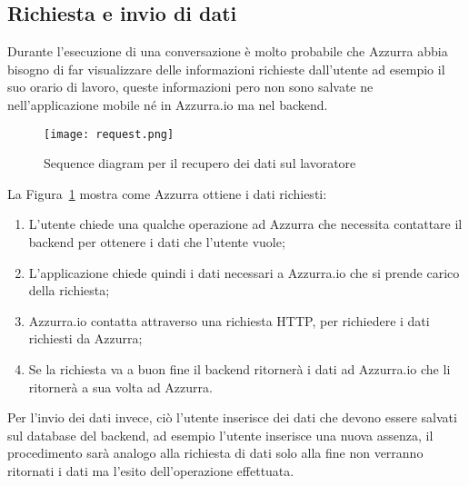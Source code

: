 \subsection{Richiesta e invio di dati}
Durante l'esecuzione di una conversazione è molto probabile che Azzurra abbia bisogno di far visualizzare delle informazioni richieste dall'utente ad esempio il suo orario di lavoro, queste informazioni pero non sono salvate ne nell'applicazione mobile né in Azzurra.io ma nel backend.
\begin{figure}[h]
	\begin{center}
		\texttt{[image: request.png]}
		\caption{Sequence diagram per il recupero dei dati sul lavoratore}\label{fig:request}
	\end{center}
\end{figure}
La Figura~\ref{fig:request} mostra come Azzurra ottiene i dati richiesti:
\begin{enumerate}
	\item L'utente chiede una qualche operazione ad Azzurra che necessita contattare il backend per ottenere i dati che l'utente vuole;
	\item L'applicazione chiede quindi i dati necessari a Azzurra.io che si prende carico della richiesta;
	\item Azzurra.io contatta attraverso una richiesta HTTP, per richiedere i dati richiesti da Azzurra;
	\item Se la richiesta va a buon fine il backend ritornerà i dati ad Azzurra.io che li ritornerà a sua volta ad Azzurra.
\end{enumerate}

Per l'invio dei dati invece, ciò l'utente inserisce dei dati che devono essere salvati sul database del backend, ad esempio l'utente inserisce una nuova assenza, il procedimento sarà analogo alla richiesta di dati solo alla fine non verranno ritornati i dati ma l'esito dell'operazione effettuata.

